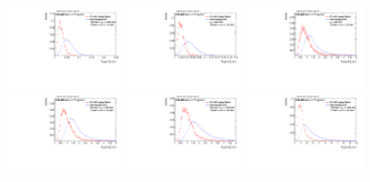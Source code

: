 \begin{figure}
\includegraphics[width=0.3\textwidth]{sascha_input/Appendix/Distributions/w/distributions/beta1/h_normal_tj_C2_bin5.pdf} \hspace{1mm}
\includegraphics[width=0.3\textwidth]{sascha_input/Appendix/Distributions/w/distributions/beta1/h_normal_tj_C2_bin6.pdf} 
\bigskip
\includegraphics[width=0.3\textwidth]{sascha_input/Appendix/Distributions/w/distributions/beta1/h_normal_tj_D2_bin1.pdf} \hspace{1mm}
\includegraphics[width=0.3\textwidth]{sascha_input/Appendix/Distributions/w/distributions/beta1/h_normal_tj_D2_bin2.pdf} \hspace{1mm}
\includegraphics[width=0.3\textwidth]{sascha_input/Appendix/Distributions/w/distributions/beta1/h_normal_tj_D2_bin3.pdf} 
\bigskip
\includegraphics[width=0.3\textwidth]{sascha_input/Appendix/Distributions/w/distributions/beta1/h_normal_tj_D2_bin4.pdf} \hspace{1mm}

\end{figure}
